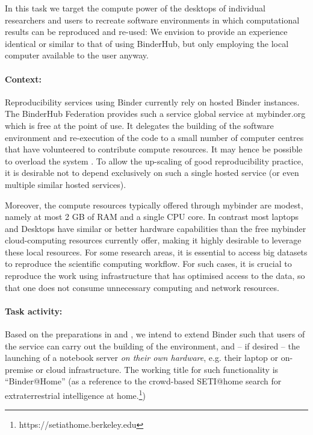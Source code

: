 \begin{task}[
  title=Binder@Home,
  id=binder-at-home,
  lead=SRL,
  PM=7,
  partners={MP,UIO}
]
In this task we target the compute power of the desktops of individual researchers and
users to recreate software environments in which computational results can be
reproduced and re-used: We envision to provide an experience identical or similar
to that of using BinderHub, but only employing the local computer available to the user anyway.

\paragraph*{Context:} Reproducibility services using Binder currently rely on hosted Binder instances.
The BinderHub Federation provides such a service global service at mybinder.org
which is free at
the point of use. It delegates the building of the software environment and
re-execution of the code to a small number of computer centres that have
volunteered to contribute compute resources.
It may hence be possible to overload the system .
To allow the up-scaling of good reproducibility practice, it is 
desirable not to depend exclusively on such a single hosted service (or even multiple similar hosted services).

Moreover, the compute resources typically offered through mybinder are modest, namely at most 2 GB of RAM
and a single CPU core.
In contrast most laptops and Desktops have similar or better hardware capabilities than
the free mybinder cloud-computing resources currently offer, making it highly desirable to leverage these local resources.
For some research areas, it is essential to access big datasets to reproduce the scientific computing workflow.
For such cases, it is crucial to reproduce the work using infrastructure that has optimised access to the data,
so that one does not consume unnecessary computing and network resources.  

\paragraph*{Task activity:} Based on the preparations in  and
, we intend to extend Binder such that users of the service can
carry out the building of the environment, and -- if desired -- the launching of a
notebook server \emph{on their own hardware}, e.g. their laptop or on-premise or cloud infrastructure.
The working title for such
functionality is ``Binder@Home'' (as a reference to the crowd-based SETI@home search for
extraterrestrial intelligence at home.\footnote{https://setiathome.berkeley.edu})


\end{task}
